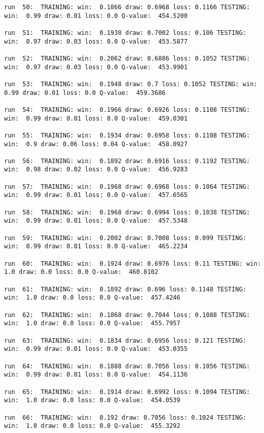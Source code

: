 \documentclass[11pt]{article}
\begin{document}
\begin{Verbatim}[commandchars=\\\{\}]
run  50:  TRAINING: win:  0.1866 draw: 0.6968 loss: 0.1166 TESTING: win:  0.99 draw: 0.01 loss: 0.0 Q-value:  454.5200

run  51:  TRAINING: win:  0.1938 draw: 0.7002 loss: 0.106 TESTING: win:  0.97 draw: 0.03 loss: 0.0 Q-value:  453.5877

run  52:  TRAINING: win:  0.2062 draw: 0.6886 loss: 0.1052 TESTING: win:  0.97 draw: 0.03 loss: 0.0 Q-value:  453.9901

run  53:  TRAINING: win:  0.1948 draw: 0.7 loss: 0.1052 TESTING: win:  0.99 draw: 0.01 loss: 0.0 Q-value:  459.3686

run  54:  TRAINING: win:  0.1966 draw: 0.6926 loss: 0.1108 TESTING: win:  0.99 draw: 0.01 loss: 0.0 Q-value:  459.0301

run  55:  TRAINING: win:  0.1934 draw: 0.6958 loss: 0.1108 TESTING: win:  0.9 draw: 0.06 loss: 0.04 Q-value:  458.0927

run  56:  TRAINING: win:  0.1892 draw: 0.6916 loss: 0.1192 TESTING: win:  0.98 draw: 0.02 loss: 0.0 Q-value:  456.9283

run  57:  TRAINING: win:  0.1968 draw: 0.6968 loss: 0.1064 TESTING: win:  0.99 draw: 0.01 loss: 0.0 Q-value:  457.6565

run  58:  TRAINING: win:  0.1968 draw: 0.6994 loss: 0.1038 TESTING: win:  0.99 draw: 0.01 loss: 0.0 Q-value:  457.5348

run  59:  TRAINING: win:  0.2002 draw: 0.7008 loss: 0.099 TESTING: win:  0.99 draw: 0.01 loss: 0.0 Q-value:  465.2234

run  60:  TRAINING: win:  0.1924 draw: 0.6976 loss: 0.11 TESTING: win:  1.0 draw: 0.0 loss: 0.0 Q-value:  460.8102

run  61:  TRAINING: win:  0.1892 draw: 0.696 loss: 0.1148 TESTING: win:  1.0 draw: 0.0 loss: 0.0 Q-value:  457.4246

run  62:  TRAINING: win:  0.1868 draw: 0.7044 loss: 0.1088 TESTING: win:  1.0 draw: 0.0 loss: 0.0 Q-value:  455.7957

run  63:  TRAINING: win:  0.1834 draw: 0.6956 loss: 0.121 TESTING: win:  0.99 draw: 0.01 loss: 0.0 Q-value:  453.0355

run  64:  TRAINING: win:  0.1888 draw: 0.7056 loss: 0.1056 TESTING: win:  0.99 draw: 0.01 loss: 0.0 Q-value:  454.1136

run  65:  TRAINING: win:  0.1914 draw: 0.6992 loss: 0.1094 TESTING: win:  1.0 draw: 0.0 loss: 0.0 Q-value:  454.0539

run  66:  TRAINING: win:  0.192 draw: 0.7056 loss: 0.1024 TESTING: win:  1.0 draw: 0.0 loss: 0.0 Q-value:  455.3292


\end{Verbatim}
\end{document}
